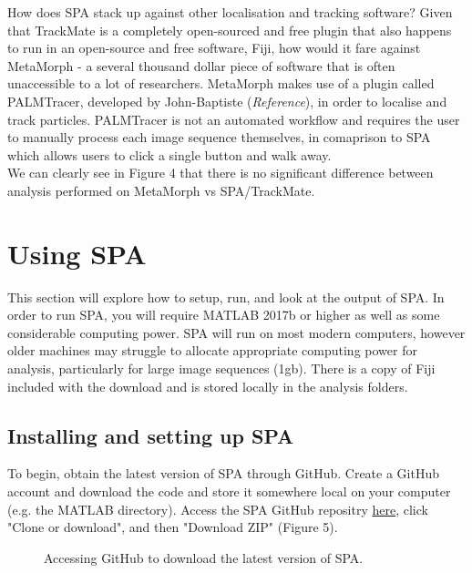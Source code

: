 \documentclass[11pt]{article} %
\begin{document}
How does SPA stack up against other localisation and tracking software? Given that TrackMate is a completely open-sourced and free plugin that also happens to run in an open-source and free software, Fiji, how would it fare against MetaMorph - a several thousand dollar piece of software that is often unaccessible to a lot of researchers. MetaMorph makes use of a plugin called PALMTracer, developed by John-Baptiste (\textit{Reference}), in order to localise and track particles. PALMTracer is not an automated workflow and requires the user to manually process each image sequence themselves, in comaprison to SPA which allows users to click a single button and walk away.\\

We can clearly see in Figure 4 that there is no significant difference between analysis performed on MetaMorph vs SPA/TrackMate. 

	\begin{figure}[H]
	\end{figure}

\section{Using SPA}

This section will explore how to setup, run, and look at the output of SPA. In order to run SPA, you will require MATLAB 2017b or higher as well as some considerable computing power. SPA will run on most modern computers, however older machines may struggle to allocate appropriate computing power for analysis, particularly for large image sequences (1gb). There is a copy of Fiji included with the download and is stored locally in the analysis folders.

\subsection{Installing and setting up SPA}

To begin, obtain the latest version of SPA through GitHub. Create a GitHub account and download the code and store it somewhere local on your computer (e.g. the MATLAB directory). Access the SPA GitHub repositry \href{https://github.com/AdamDHines/sptPALM-Analysis.git}{here}, click "Clone or download", and then "Download ZIP" (Figure 5).

	\begin{figure}[H]
	\caption{Accessing GitHub to download the latest version of SPA.}
	\end{figure} 
\end{document}
